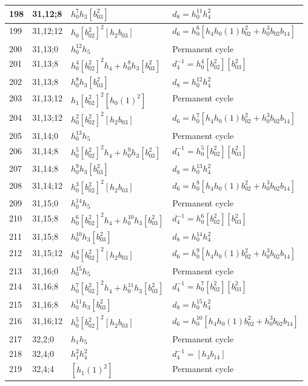 \documentclass{article}
\begin{document}
\begin{longtable}{|l|l|>{\raggedright\arraybackslash}p{6cm}|>{\raggedright\arraybackslash}p{6cm}|}
198 & 31,12;8 & $h_0^7h_3[b_{03}^2]$ &$d_{8}=h_0^{11}h_4^2$\\
\hline
199 & 31,12;12 & $h_0[b_{02}^2]^2[h_2b_{03}]$ &$d_{6}=h_0^6[h_4h_0(1)b_{02}^2 + h_0^3b_{02}b_{14}]$\\
\hline
200 & 31,13;0 & $h_0^{12}h_5$ & Permanent cycle\\
\hline
201 & 31,13;8 & $h_0^4[b_{02}^2]^2h_4 + h_0^8h_3[b_{03}^2]$ & $d_{4}^{-1}=h_0^4[b_{02}^2][b_{03}^2]$\\
202 & 31,13;8 & $h_0^8h_3[b_{03}^2]$ &$d_{8}=h_0^{12}h_4^2$\\
\hline
203 & 31,13;12 & $h_1[b_{02}^2]^2[h_0(1)^2]$ & Permanent cycle\\
204 & 31,13;12 & $h_0^2[b_{02}^2]^2[h_2b_{03}]$ &$d_{6}=h_0^7[h_4h_0(1)b_{02}^2 + h_0^3b_{02}b_{14}]$\\
\hline
205 & 31,14;0 & $h_0^{13}h_5$ & Permanent cycle\\
\hline
206 & 31,14;8 & $h_0^5[b_{02}^2]^2h_4 + h_0^9h_3[b_{03}^2]$ & $d_{4}^{-1}=h_0^5[b_{02}^2][b_{03}^2]$\\
207 & 31,14;8 & $h_0^9h_3[b_{03}^2]$ &$d_{8}=h_0^{13}h_4^2$\\
\hline
208 & 31,14;12 & $h_0^3[b_{02}^2]^2[h_2b_{03}]$ &$d_{6}=h_0^8[h_4h_0(1)b_{02}^2 + h_0^3b_{02}b_{14}]$\\
\hline
209 & 31,15;0 & $h_0^{14}h_5$ & Permanent cycle\\
\hline
210 & 31,15;8 & $h_0^6[b_{02}^2]^2h_4 + h_0^{10}h_3[b_{03}^2]$ & $d_{4}^{-1}=h_0^6[b_{02}^2][b_{03}^2]$\\
211 & 31,15;8 & $h_0^{10}h_3[b_{03}^2]$ &$d_{8}=h_0^{14}h_4^2$\\
\hline
212 & 31,15;12 & $h_0^4[b_{02}^2]^2[h_2b_{03}]$ &$d_{6}=h_0^9[h_4h_0(1)b_{02}^2 + h_0^3b_{02}b_{14}]$\\
\hline
213 & 31,16;0 & $h_0^{15}h_5$ & Permanent cycle\\
\hline
214 & 31,16;8 & $h_0^7[b_{02}^2]^2h_4 + h_0^{11}h_3[b_{03}^2]$ & $d_{4}^{-1}=h_0^7[b_{02}^2][b_{03}^2]$\\
215 & 31,16;8 & $h_0^{11}h_3[b_{03}^2]$ &$d_{8}=h_0^{15}h_4^2$\\
\hline
216 & 31,16;12 & $h_0^5[b_{02}^2]^2[h_2b_{03}]$ &$d_{6}=h_0^{10}[h_4h_0(1)b_{02}^2 + h_0^3b_{02}b_{14}]$\\
\hline
217 & 32,2;0 & $h_1h_5$ & Permanent cycle\\
\hline
218 & 32,4;0 & $h_1^2h_4^2$ & $d_{4}^{-1}=[h_3b_{14}]$\\
\hline
219 & 32,4;4 & $[h_1(1)^2]$ & Permanent cycle\\

\end{longtable}
\end{document}
